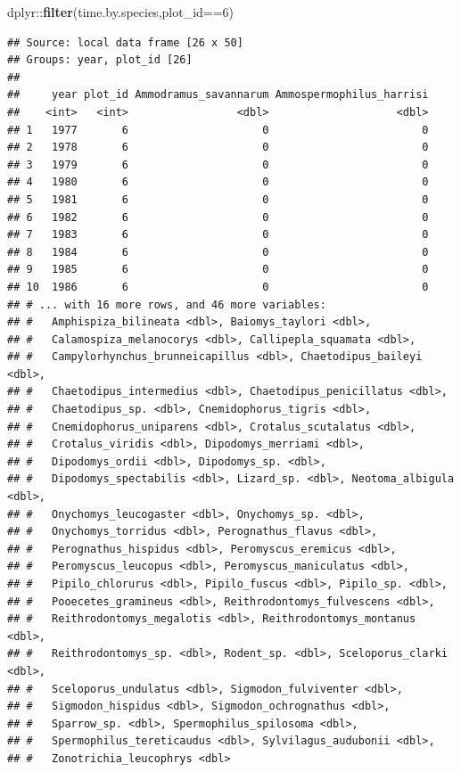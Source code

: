 \documentclass[]{article}
\newenvironment{Shaded}{\begin{snugshade}}{\end{snugshade}}
\newcommand{\KeywordTok}[1]{\textcolor[rgb]{0.13,0.29,0.53}{\textbf{{#1}}}}
\newcommand{\DecValTok}[1]{\textcolor[rgb]{0.00,0.00,0.81}{{#1}}}
\newcommand{\NormalTok}[1]{{#1}}
\begin{document}
\begin{Shaded}
\begin{Highlighting}[]
\NormalTok{dplyr::}\KeywordTok{filter}\NormalTok{(time.by.species,plot_id==}\DecValTok{6}\NormalTok{)}
\end{Highlighting}
\end{Shaded}

\begin{verbatim}
## Source: local data frame [26 x 50]
## Groups: year, plot_id [26]
## 
##     year plot_id Ammodramus_savannarum Ammospermophilus_harrisi
##    <int>   <int>                 <dbl>                    <dbl>
## 1   1977       6                     0                        0
## 2   1978       6                     0                        0
## 3   1979       6                     0                        0
## 4   1980       6                     0                        0
## 5   1981       6                     0                        0
## 6   1982       6                     0                        0
## 7   1983       6                     0                        0
## 8   1984       6                     0                        0
## 9   1985       6                     0                        0
## 10  1986       6                     0                        0
## # ... with 16 more rows, and 46 more variables:
## #   Amphispiza_bilineata <dbl>, Baiomys_taylori <dbl>,
## #   Calamospiza_melanocorys <dbl>, Callipepla_squamata <dbl>,
## #   Campylorhynchus_brunneicapillus <dbl>, Chaetodipus_baileyi <dbl>,
## #   Chaetodipus_intermedius <dbl>, Chaetodipus_penicillatus <dbl>,
## #   Chaetodipus_sp. <dbl>, Cnemidophorus_tigris <dbl>,
## #   Cnemidophorus_uniparens <dbl>, Crotalus_scutalatus <dbl>,
## #   Crotalus_viridis <dbl>, Dipodomys_merriami <dbl>,
## #   Dipodomys_ordii <dbl>, Dipodomys_sp. <dbl>,
## #   Dipodomys_spectabilis <dbl>, Lizard_sp. <dbl>, Neotoma_albigula <dbl>,
## #   Onychomys_leucogaster <dbl>, Onychomys_sp. <dbl>,
## #   Onychomys_torridus <dbl>, Perognathus_flavus <dbl>,
## #   Perognathus_hispidus <dbl>, Peromyscus_eremicus <dbl>,
## #   Peromyscus_leucopus <dbl>, Peromyscus_maniculatus <dbl>,
## #   Pipilo_chlorurus <dbl>, Pipilo_fuscus <dbl>, Pipilo_sp. <dbl>,
## #   Pooecetes_gramineus <dbl>, Reithrodontomys_fulvescens <dbl>,
## #   Reithrodontomys_megalotis <dbl>, Reithrodontomys_montanus <dbl>,
## #   Reithrodontomys_sp. <dbl>, Rodent_sp. <dbl>, Sceloporus_clarki <dbl>,
## #   Sceloporus_undulatus <dbl>, Sigmodon_fulviventer <dbl>,
## #   Sigmodon_hispidus <dbl>, Sigmodon_ochrognathus <dbl>,
## #   Sparrow_sp. <dbl>, Spermophilus_spilosoma <dbl>,
## #   Spermophilus_tereticaudus <dbl>, Sylvilagus_audubonii <dbl>,
## #   Zonotrichia_leucophrys <dbl>
\end{verbatim}
\end{document}
